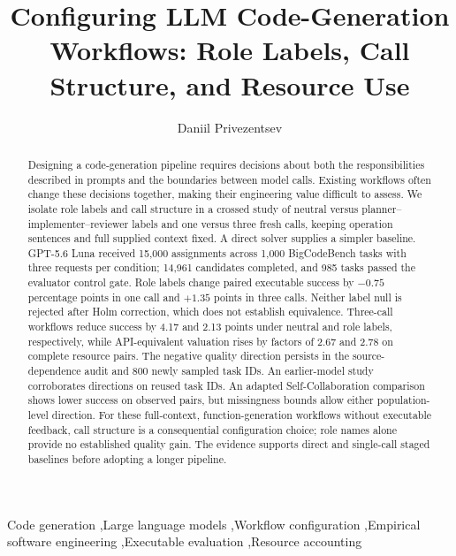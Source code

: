 \documentclass[preprint,12pt,authoryear]{elsarticle}
\begin{document}
\begin{frontmatter}
\title{Configuring LLM Code-Generation Workflows: Role Labels, Call Structure, and Resource Use}
\author[hse]{Daniil Privezentsev}
\begin{abstract}
Designing a code-generation pipeline requires decisions about both the responsibilities described in prompts and the boundaries between model calls. Existing workflows often change these decisions together, making their engineering value difficult to assess. We isolate role labels and call structure in a crossed study of neutral versus planner--implementer--reviewer labels and one versus three fresh calls, keeping operation sentences and full supplied context fixed. A direct solver supplies a simpler baseline. GPT-5.6 Luna received 15,000 assignments across 1,000 BigCodeBench tasks with three requests per condition; 14,961 candidates completed, and 985 tasks passed the evaluator control gate. Role labels change paired executable success by $-0.75$ percentage points in one call and $+1.35$ points in three calls. Neither label null is rejected after Holm correction, which does not establish equivalence. Three-call workflows reduce success by 4.17 and 2.13 points under neutral and role labels, respectively, while API-equivalent valuation rises by factors of 2.67 and 2.78 on complete resource pairs. The negative quality direction persists in the source-dependence audit and 800 newly sampled task IDs. An earlier-model study corroborates directions on reused task IDs. An adapted Self-Collaboration comparison shows lower success on observed pairs, but missingness bounds allow either population-level direction. For these full-context, function-generation workflows without executable feedback, call structure is a consequential configuration choice; role names alone provide no established quality gain. The evidence supports direct and single-call staged baselines before adopting a longer pipeline.
\end{abstract}
\begin{keyword}
Code generation \sep Large language models \sep Workflow configuration \sep Empirical software engineering \sep Executable evaluation \sep Resource accounting
\end{keyword}
\end{frontmatter}



\end{document}

